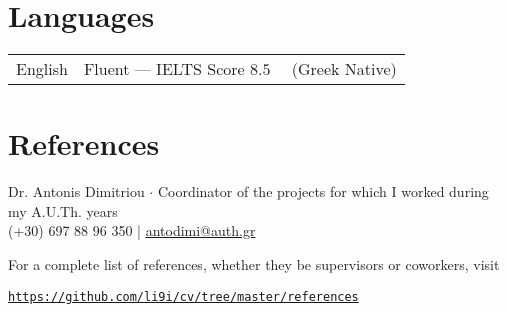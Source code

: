 \documentclass[a4paper,10pt,twoside]{article}
\begin{document}

\section{Languages}

\begin{tabular}{rp{12cm}}
  English & Fluent --- IELTS Score $8.5$ \ \ (Greek Native)
\end{tabular}

\vspace{0.2cm}
\section{References}
\noindent Dr. Antonis Dimitriou $\cdot$ Coordinator of the projects for which I worked during my A.U.Th. years \\
  (+30) 697 88 96 350 | \href{mailto:antodimi@auth.gr}{antodimi@auth.gr} \vspace{5pt}

\noindent For a complete list of references, whether they be supervisors or coworkers, visit
\begin{center}\noindent
\href{https://github.com/li9i/cv/tree/master/references}{\texttt{https://github.com/li9i/cv/tree/master/references}}
\end{center}
\end{document}

